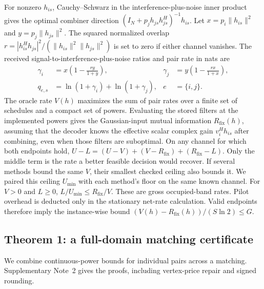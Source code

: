\documentclass[lineno,pdflatex,sn-nature]{sn-jnl}
\begin{document}
For nonzero \(h_{is}\), Cauchy--Schwarz in the interference-plus-noise inner product gives the optimal combiner direction \((I_N+p_j h_{js}h_{js}^{H})^{-1}h_{is}\). Let \(x=p_i\|h_{is}\|^2\) and \(y=p_j\|h_{js}\|^2\). The squared normalized overlap \(r=|h_{is}^{H}h_{js}|^2/(\|h_{is}\|^2\|h_{js}\|^2)\) is set to zero if either channel vanishes. The received signal-to-interference-plus-noise ratios and pair rate in nats are
\begin{equation}
\begin{aligned}
\gamma_i &= x\left(1-\frac{r y}{1+y}\right), &
\gamma_j &= y\left(1-\frac{r x}{1+x}\right),\\
q_{e,s} &= \ln(1+\gamma_i)+\ln(1+\gamma_j), & e&=\{i,j\}.
\end{aligned}
\label{eq:sinr}
\end{equation}
The oracle rate \(V(h)\) maximizes the sum of pair rates over a finite set of schedules and a compact set of powers. Evaluating the stored filters at the implemented powers gives the Gaussian-input mutual information \({R_{\mathrm{fix}}}(h)\), assuming that the decoder knows the effective scalar complex gain \(v_i^Hh_{is}\) after combining, even when those filters are suboptimal. On any channel for which both endpoints hold, \(U-L=(U-V)+(V-{R_{\mathrm{fix}}})+({R_{\mathrm{fix}}}-L)\). Only the middle term is the rate a better feasible decision would recover. If several methods bound the same \(V\), their smallest checked ceiling also bounds it. We paired this ceiling \(U_{\min}\) with each method's floor on the same known channel. For \(V>0\) and \(L\ge0\), \(L/U_{\min}\le{R_{\mathrm{fix}}}/V\). These are gross occupied-band rates. Pilot overhead is deducted only in the stationary net-rate calculation. Valid endpoints therefore imply the instance-wise bound \((V(h)-{R_{\mathrm{fix}}}(h))/(S\ln 2)\leq G\).

\subsection*{Theorem 1: a full-domain matching certificate}
We combine continuous-power bounds for individual pairs across a matching. Supplementary Note~2 gives the proofs, including vertex-price repair and signed rounding.
\end{document}

